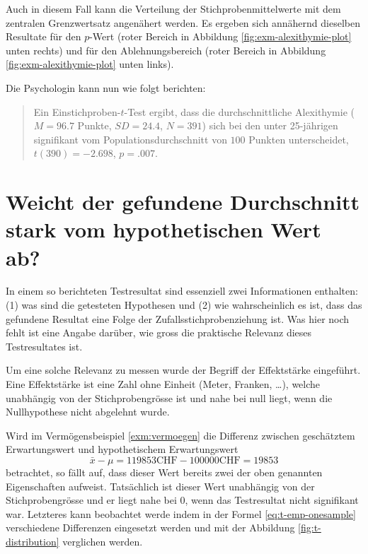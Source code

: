\documentclass[
]{book}
\theoremstyle{definition}
\theoremstyle{definition}
\theoremstyle{definition}
\theoremstyle{definition}
\theoremstyle{remark}
\begin{document}
Auch in diesem Fall kann die Verteilung der Stichprobenmittelwerte mit dem zentralen Grenzwertsatz angenähert werden. Es ergeben sich annähernd dieselben Resultate für den \(p\)-Wert (roter Bereich in Abbildung \ref{fig:exm-alexithymie-plot} unten rechts) und für den Ablehnungsbereich (roter Bereich in Abbildung \ref{fig:exm-alexithymie-plot} unten links).

Die Psychologin kann nun wie folgt berichten:

\begin{quote}
Ein Einstichproben-\(t\)-Test ergibt, dass die durchschnittliche Alexithymie (\(M = 96.7\) Punkte, \(SD = 24.4\), \(N = 391\)) sich bei den unter 25-jährigen signifikant vom Populationsdurchschnitt von \(100\) Punkten unterscheidet, \(t(390) = -2.698\), \(p = .007\).
\end{quote}

\section{Weicht der gefundene Durchschnitt stark vom hypothetischen Wert ab?}\label{weicht-der-gefundene-durchschnitt-stark-vom-hypothetischen-wert-ab}

In einem so berichteten Testresultat sind essenziell zwei Informationen enthalten: (1) was sind die getesteten Hypothesen und (2) wie wahrscheinlich es ist, dass das gefundene Resultat eine Folge der Zufallsstichprobenziehung ist. Was hier noch fehlt ist eine Angabe darüber, wie gross die praktische Relevanz dieses Testresultates ist.

Um eine solche Relevanz zu messen wurde der Begriff der Effektstärke eingeführt. Eine Effektstärke ist eine Zahl ohne Einheit (Meter, Franken, \ldots), welche unabhängig von der Stichprobengrösse ist und nahe bei null liegt, wenn die Nullhypothese nicht abgelehnt wurde.

Wird im Vermögensbeispiel \ref{exm:vermoegen} die Differenz zwischen geschätztem Erwartungswert und hypothetischem Erwartungswert
\[\bar{x} - \mu = 119853 \text{CHF} - 100000 \text{CHF}  = 19853\]
betrachtet, so fällt auf, dass dieser Wert bereits zwei der oben genannten Eigenschaften aufweist. Tatsächlich ist dieser Wert unabhängig von der Stichprobengrösse und er liegt nahe bei \(0\), wenn das Testresultat nicht signifikant war. Letzteres kann beobachtet werde indem in der Formel \eqref{eq:t-emp-onesample} verschiedene Differenzen eingesetzt werden und mit der Abbildung \ref{fig:t-distribution} verglichen werden.
\end{document}
